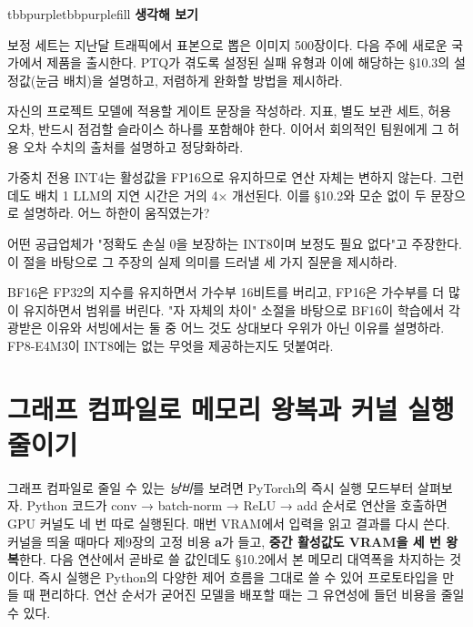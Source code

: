 \begin{calloutbox}{tbbpurple}{tbbpurplefill}
{\normalsize\bfseries\color{tbbpurple}생각해 보기}\par\vspace{3pt}
\begin{tbbitemize}
  \item 보정 세트는 지난달 트래픽에서 표본으로 뽑은 이미지 500장이다. 다음 주에 새로운 국가에서 제품을 출시한다. PTQ가 겪도록 설정된 실패 유형과 이에 해당하는 §10.3의 설정값(눈금 배치)을 설명하고, 저렴하게 완화할 방법을 제시하라.
  \item 자신의 프로젝트 모델에 적용할 게이트 문장을 작성하라. 지표, 별도 보관 세트, 허용 오차, 반드시 점검할 슬라이스 하나를 포함해야 한다. 이어서 회의적인 팀원에게 그 허용 오차 수치의 출처를 설명하고 정당화하라.
  \item 가중치 전용 INT4는 활성값을 FP16으로 유지하므로 연산 자체는 변하지 않는다. 그런데도 배치 1 LLM의 지연 시간은 거의 4× 개선된다. 이를 §10.2와 모순 없이 두 문장으로 설명하라. 어느 하한이 움직였는가?
  \item 어떤 공급업체가 "정확도 손실 0을 보장하는 INT8이며 보정도 필요 없다"고 주장한다. 이 절을 바탕으로 그 주장의 실제 의미를 드러낼 세 가지 질문을 제시하라.
  \item BF16은 FP32의 지수를 유지하면서 가수부 16비트를 버리고, FP16은 가수부를 더 많이 유지하면서 범위를 버린다. "자 자체의 차이" 소절을 바탕으로 BF16이 학습에서 각광받은 이유와 서빙에서는 둘 중 어느 것도 상대보다 우위가 아닌 이유를 설명하라. FP8-E4M3이 INT8에는 없는 무엇을 제공하는지도 덧붙여라.
\end{tbbitemize}
\end{calloutbox}

\section{그래프 컴파일로 메모리 왕복과 커널 실행 줄이기}

그래프 컴파일로 줄일 수 있는 \textit{낭비}를 보려면 PyTorch의 즉시 실행 모드부터 살펴보자. Python 코드가 conv → batch-norm → ReLU → add 순서로 연산을 호출하면 GPU 커널도 네 번 따로 실행된다. 매번 VRAM에서 입력을 읽고 결과를 다시 쓴다. 커널을 띄울 때마다 제9장의 고정 비용 \textbf{a}가 들고, \textbf{중간 활성값도 VRAM을 세 번 왕복}한다. 다음 연산에서 곧바로 쓸 값인데도 §10.2에서 본 메모리 대역폭을 차지하는 것이다. 즉시 실행은 Python의 다양한 제어 흐름을 그대로 쓸 수 있어 프로토타입을 만들 때 편리하다. 연산 순서가 굳어진 모델을 배포할 때는 그 유연성에 들던 비용을 줄일 수 있다.

